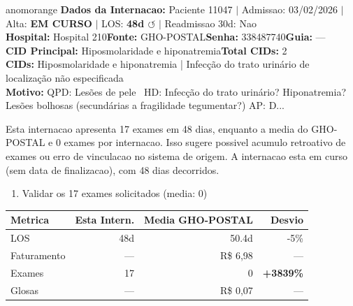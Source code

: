 \documentclass[a4paper,10pt]{article}
\begin{document}
\begin{anomalycard}[Internacao 10387 | GHO-POSTAL | ALTO (z=3.71)]{anomorange}
\textbf{Dados da Internacao:} Paciente 11047 $\mid$ Admissao: 03/02/2026 $\mid$ Alta: \textcolor{anomorange}{\textbf{EM CURSO}} $\mid$ LOS: \textbf{48d \textcolor{anomorange}{$\circlearrowleft$}} $\mid$ Readmissao 30d: Nao\\
\textbf{Hospital:} Hospital 210\quad\textbf{Fonte:} GHO-POSTAL\quad\textbf{Senha:} 338487740\quad\textbf{Guia:} ---\\
\textbf{CID Principal:} {\small Hiposmolaridade e hiponatremia}\quad\textbf{Total CIDs:} 2\\

\textbf{CIDs:} {\scriptsize Hiposmolaridade e hiponatremia | Infecção do trato urinário de localização não especificada}\\

\textbf{Motivo:} {\scriptsize QPD: Lesões de pele  HD: Infecção do trato urinário? Hiponatremia? Lesões bolhosas (secundárias a fragilidade tegumentar?) AP: D...}\\

\vspace{2pt}\begin{tcolorbox}[colback=severityred!20,colframe=anomorange,title={\textbf{Interpretacao de Negocio}},fonttitle=\bfseries\small,left=4pt,right=4pt,top=3pt,bottom=3pt]
{\small Esta internacao apresenta 17 exames em 48 dias, enquanto a media do GHO-POSTAL e 0 exames por internacao. Isso sugere possivel acumulo retroativo de exames ou erro de vinculacao no sistema de origem. A internacao esta em curso (sem data de finalizacao), com 48 dias decorridos.}
\end{tcolorbox}
\begin{tcolorbox}[colback=severityyellow!30,colframe=anomorange,title={\textbf{Recomendacoes Especificas}},fonttitle=\bfseries\small,left=4pt,right=4pt,top=3pt,bottom=3pt]
\begin{enumerate}[nosep,leftmargin=16pt]
\item {\small Validar os 17 exames solicitados (media: 0)}
\end{enumerate}
\end{tcolorbox}
\begin{center}\begin{tabular}{l r r r}\toprule\textbf{Metrica} & \textbf{Esta Intern.} & \textbf{Media GHO-POSTAL} & \textbf{Desvio} \\\midrule
LOS & 48d & 50.4d & -5\% \\
Faturamento & --- & R\$ 6,98 & --- \\
Exames & 17 & 0 & \textcolor{anomred}{\textbf{+3839\%}} \\
Glosas & --- & R\$ 0,07 & --- \\
\bottomrule\end{tabular}\end{center}


\end{anomalycard}
\end{document}
